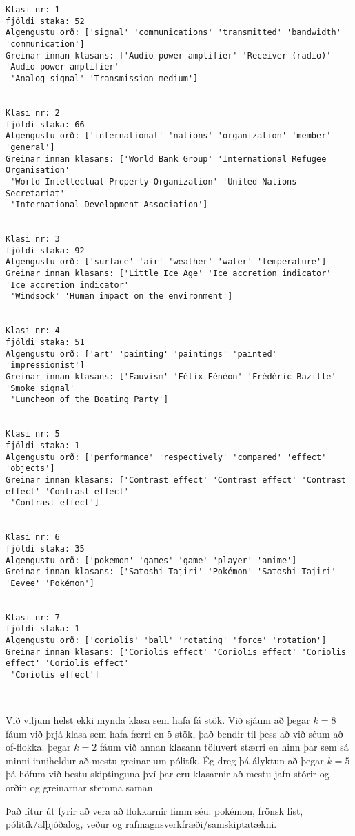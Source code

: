\documentclass[11pt]{article}
\begin{document}
\begin{Verbatim}[commandchars=\\\{\}]
Klasi nr: 1
fjöldi staka: 52
Algengustu orð: ['signal' 'communications' 'transmitted' 'bandwidth' 'communication']
Greinar innan klasans: ['Audio power amplifier' 'Receiver (radio)' 'Audio power amplifier'
 'Analog signal' 'Transmission medium']


Klasi nr: 2
fjöldi staka: 66
Algengustu orð: ['international' 'nations' 'organization' 'member' 'general']
Greinar innan klasans: ['World Bank Group' 'International Refugee Organisation'
 'World Intellectual Property Organization' 'United Nations Secretariat'
 'International Development Association']


Klasi nr: 3
fjöldi staka: 92
Algengustu orð: ['surface' 'air' 'weather' 'water' 'temperature']
Greinar innan klasans: ['Little Ice Age' 'Ice accretion indicator' 'Ice accretion indicator'
 'Windsock' 'Human impact on the environment']


Klasi nr: 4
fjöldi staka: 51
Algengustu orð: ['art' 'painting' 'paintings' 'painted' 'impressionist']
Greinar innan klasans: ['Fauvism' 'Félix Fénéon' 'Frédéric Bazille' 'Smoke signal'
 'Luncheon of the Boating Party']


Klasi nr: 5
fjöldi staka: 1
Algengustu orð: ['performance' 'respectively' 'compared' 'effect' 'objects']
Greinar innan klasans: ['Contrast effect' 'Contrast effect' 'Contrast effect' 'Contrast effect'
 'Contrast effect']


Klasi nr: 6
fjöldi staka: 35
Algengustu orð: ['pokemon' 'games' 'game' 'player' 'anime']
Greinar innan klasans: ['Satoshi Tajiri' 'Pokémon' 'Satoshi Tajiri' 'Eevee' 'Pokémon']


Klasi nr: 7
fjöldi staka: 1
Algengustu orð: ['coriolis' 'ball' 'rotating' 'force' 'rotation']
Greinar innan klasans: ['Coriolis effect' 'Coriolis effect' 'Coriolis effect' 'Coriolis effect'
 'Coriolis effect']



    \end{Verbatim}

    Við viljum helst ekki mynda klasa sem hafa fá stök. Við sjáum að þegar
\(k=8\) fáum við þrjá klasa sem hafa færri en 5 stök, það bendir til
þess að við séum að of-flokka. þegar \(k=2\) fáum við annan klasann
töluvert stærri en hinn þar sem sá minni inniheldur að mestu greinar um
pólitík. Ég dreg þá ályktun að þegar \(k=5\) þá höfum við bestu
skiptinguna því þar eru klasarnir að mestu jafn stórir og orðin og
greinarnar stemma saman.

Það lítur út fyrir að vera að flokkarnir fimm séu: pokémon, frönsk list,
pólitík/alþjóðalög, veður og rafmagnsverkfræði/samskiptatækni.
\end{document}
